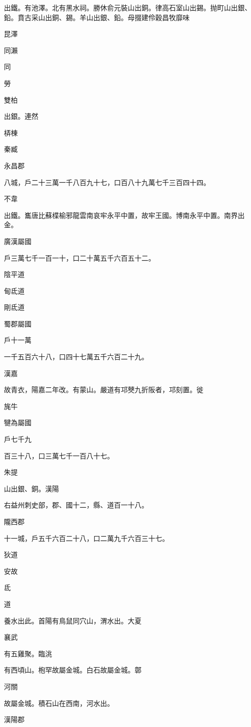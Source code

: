 \begin{pinyinscope}
出鐵。有池澤。北有黑水祠。勝休俞元裝山出銅。律高石室山出錫。抛町山出銀、鉛。賁古采山出銅、錫。羊山出銀、鉛。母掇建伶穀昌牧靡味

昆澤

同瀨

同

勞

雙柏

出銀。連然

梇棟

秦臧

永昌郡

八城，戶二十三萬一千八百九十七，口百八十九萬七千三百四十四。

不韋

出鐵。巂唐比蘇楪榆邪龍雲南哀牢永平中置，故牢王國。博南永平中置。南界出金。

廣漢屬國

戶三萬七千一百一十，口二十萬五千六百五十二。

陰平道

甸氐道

剛氐道

蜀郡屬國

戶十一萬

一千五百六十八，口四十七萬五千六百二十九。

漢嘉

故青衣，陽嘉二年改。有蒙山。嚴道有邛僰九折阪者，邛刻置。徙

旄牛

犍為屬國

戶七千九

百三十八，口三萬七千一百八十七。

朱提

山出銀、銅。漢陽

右益州刺史部，郡、國十二，縣、道百一十八。

隴西郡

十一城，戶五千六百二十八，口二萬九千六百三十七。

狄道

安故

氐

道

養水出此。首陽有鳥鼠同穴山，渭水出。大夏

襄武

有五雞聚。臨洮

有西頃山。枹罕故屬金城。白石故屬金城。鄣

河關

故屬金城。積石山在西南，河水出。

漢陽郡


\end{pinyinscope}
